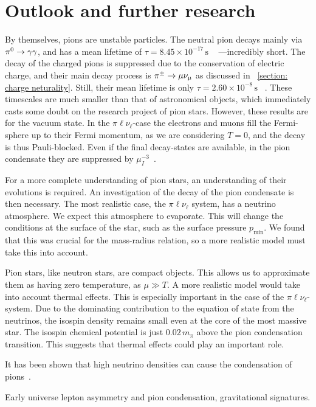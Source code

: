 \section{Outlook and further research}

By themselves, pions are unstable particles.
The neutral pion decays mainly via ${\pi^0}\rightarrow \gamma\gamma$, and has a mean lifetime of $\tau = 8.45\times 10^{-17}\,\text{s}$
%
~\autocite{particledatagroupReviewParticlePhysics2020}
%
---incredibly short.
The decay of the charged pions is suppressed due to the conservation of electric charge, and their main decay process is ${\pi^\pm}\rightarrow \mu \nu_\mu$ as discussed in
%
~\autoref{section: charge neturality}.
%
Still, their mean lifetime is only $\tau = 2.60\times 10^{-8}\,\text{s}$
%
~\autocite{particledatagroupReviewParticlePhysics2020}.
%
These timescales are much smaller than that of astronomical objects, which immediately casts some doubt on the research project of pion stars.
However, these results are for the vacuum state.
In the $\pi\ell\nu_\ell$-case the electrons and muons fill the Fermi-sphere up to their Fermi momentum, as we are considering $T = 0$, and the decay is thus Pauli-blocked.
Even if the final decay-states are available, in the pion condensate they are suppressed by $\mu_I^{-3}$~\autocite{brandtNewClassCompact2018}.

For a more complete understanding of pion stars, an understanding of their evolutions is required.
An investigation of the decay of the pion condensate is then necessary.
The most realistic case, the $\pi\ell\nu_\ell$ system, has a neutrino atmosphere.
We expect this atmosphere to evaporate.
This will change the conditions at the surface of the star, such as the surface pressure $p_\text{min}$.
We found that this was crucial for the mass-radius relation, so a more realistic model must take this into account.



Pion stars, like neutron stars, are compact objects.
This allows us to approximate them as having zero temperature, as $\mu \gg T$.
A more realistic model would take into account thermal effects.
This is especially important in the case of the $\pi\ell\nu_\ell$-system.
Due to the dominating contribution to the equation of state from the neutrinos, the isospin density remains small even at the core of the most massive star.
The isospin chemical potential is just $0.02\,m_\pi$ above the pion condensation transition.
This suggests that thermal effects could play an important role.


It has been shown that high neutrino densities can cause the condensation of pions~\autocite{abukiPionCondensationDense2009}.

Early universe lepton asymmetry and pion condensation, gravitational signatures\autocite{vovchenkoPionCondensationEarly2021,wygasCosmicQCDEpoch2018}.


